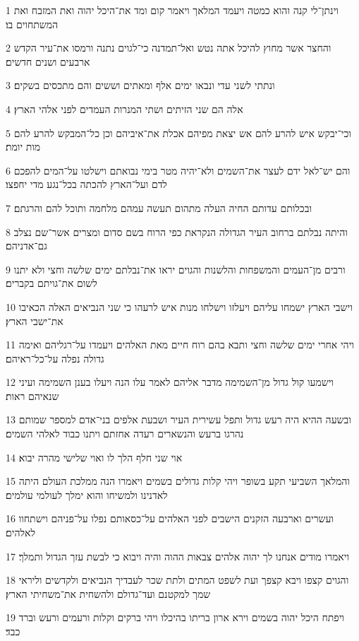 \par 1 וינתן־לי קנה והוא כמטה ויעמד המלאך ויאמר קום ומד את־היכל יהוה ואת המזבח ואת המשתחוים בו׃
\par 2 והחצר אשר מחוץ להיכל אתה נטש ואל־תמדנה כי־לגוים נתנה ורמסו את־עיר הקדש ארבעים ושנים חדשים׃
\par 3 ונתתי לשני עדי ונבאו ימים אלף ומאתים וששים והם מתכסים בשקים׃
\par 4 אלה הם שני הזיתים ושתי המנרות העמדים לפני אלהי הארץ׃
\par 5 וכי־יבקש איש להרע להם אש יצאת מפיהם אכלת את־איביהם וכן כל־המבקש להרע להם מות יומת׃
\par 6 והם יש־לאל ידם לעצר את־השמים ולא־יהיה מטר בימי נבואתם וישלטו על־המים להפכם לדם ועל־הארץ להכתה בכל־נגע מדי יחפצו׃
\par 7 ובכלותם עדותם החיה העלה מתהום תעשה עמהם מלחמה ותוכל להם והרגתם׃
\par 8 והיתה נבלתם ברחוב העיר הגדולה הנקראת כפי הרוח בשם סדום ומצרים אשר־שם נצלב גם־אדניהם׃
\par 9 ורבים מן־העמים והמשפחות והלשנות והגוים יראו את־נבלתם ימים שלשה וחצי ולא יתנו לשום את־גויתם בקברים׃
\par 10 וישבי הארץ ישמחו עליהם ויעלזו וישלחו מנות איש לרעהו כי שני הנביאים האלה הכאיבו את־ישבי הארץ׃
\par 11 ויהי אחרי ימים שלשה וחצי ותבא בהם רוח חיים מאת האלהים ויעמדו על־רגליהם ואימה גדולה נפלה על־כל־ראיהם׃
\par 12 וישמעו קול גדול מן־השמימה מדבר אליהם לאמר עלו הנה ויעלו בענן השמימה ועיני שנאיהם ראות׃
\par 13 ובשעה ההיא היה רעש גדול ותפל עשירית העיר ושבעת אלפים בני־אדם למספר שמותם נהרגו ברעש והנשארים רעדה אחזתם ויתנו כבוד לאלהי השמים׃
\par 14 אוי שני חלף הלך לו ואוי שלישי מהרה יבוא׃
\par 15 והמלאך השביעי תקע בשופר ויהי קלות גדולים בשמים ויאמרו הנה ממלכת העולם היתה לאדנינו ולמשיחו והוא ימלך לעולמי עולמים׃
\par 16 ועשרים וארבעה הזקנים הישבים לפני האלהים על־כסאותם נפלו על־פניהם וישתחוו לאלהים׃
\par 17 ויאמרו מודים אנחנו לך יהוה אלהים צבאות ההוה והיה ויבוא כי לבשת עזך הגדול ותמלך׃
\par 18 והגוים קצפו ויבא קצפך ועת לשפט המתים ולתת שכר לעבדיך הנביאים ולקדשים וליראי שמך למקטנם ועד־גדולם ולהשחית את־משחיתי הארץ׃
\par 19 ויפתח היכל יהוה בשמים וירא ארון בריתו בהיכלו ויהי ברקים וקלות ורעמים ורעש וברד כבד׃

